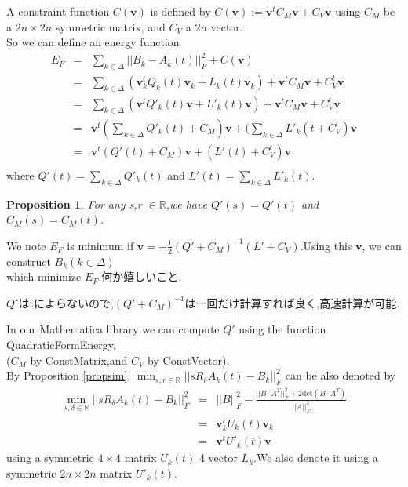 \documentclass[8pt]{article}
\newtheorem{prop}{\bf Proposition}
\begin{document}
A constraint function $C(\mathbf{v})$ is defined by 
$
C(\mathbf{v}) := \mathbf{v}^t C_M \mathbf{v} + C_V \mathbf{v}
$
using $C_M$ be a $2n \times 2n$ symmetric matrix, and $C_V$ a $2n$ vector.\\
So we can define an energy function 
\begin{eqnarray*}
E_F &=& \sum_{k \in \Delta} ||B_k - A_k(t)||^2_F + C(\mathbf{v})\\
	&=& \sum_{k \in \Delta} (\mathbf{v}^t_k Q_k(t) \mathbf{v}_k + L_k(t) \mathbf{v}_k )+ \mathbf{v}^t C_M \mathbf{v} + C_V^t \mathbf{v} \\
	&=& \sum_{k \in \Delta} (\mathbf{\mathbf{v}}^t Q'_k(t) \mathbf{v} + L'_k(t) \mathbf{v}) +  \mathbf{v}^t C_M \mathbf{v} + C_V^t \mathbf{v} \\
	&=& \mathbf{v}^t (\sum_{k \in \Delta} Q'_k(t) + C_M)\mathbf{v} + (\sum_{k \in \Delta}L'_k(t + C_V^t) \mathbf{v}\\
	&=& \mathbf{v}^t (Q'(t) + C_M)\mathbf{v} + (L' (t)+ C_V^t) \mathbf{v}\\
\end{eqnarray*}
where $\displaystyle Q' (t)= \sum_{k \in \Delta}Q'_k(t)$ and $ \displaystyle L'(t) = \sum_{k \in \Delta}L'_k(t)$.\\

\begin{prop}
For any s,r $\in \mathbb{R}$,we have $Q'(s) = Q'(t) $ and $C_M(s) = C_M(t)$.
\end{prop}

We note $E_F$ is minimum if $\mathbf{v} = - \frac{1}{2}(Q' + C_M)^{-1}(L' + C_V)$.Using this $\mathbf{v}$, we can construct $B_k(k \in \Delta)$ \\
which minimize $E_F$.何か嬉しいこと.\\

\begin{screen}
$Q'$はtによらないので,$(Q' + C_M)^{-1}$は一回だけ計算すれば良く,高速計算が可能.
\end{screen}
In our Mathematica library we can compute $Q' $ using the function QuadraticFormEnergy,\\
($C_M$ by ConstMatrix,and $C_V$ by ConstVector).\\


By Proposition \ref{propsim}, $ \displaystyle \min_{s,r \in \mathbb{R}} ||sR_\delta A_k(t) - B_k||_F^2$ can be also denoted by
\begin{eqnarray*}
\min_{s,\delta \in \mathbb{R}}||sR_\delta A_k(t) - B_k||_F^2 &=& ||B||^2_F - \frac{||B \cdot A^T||_F^2 + 2 \mathrm {det}(B \cdot A^T)}{||A||^2_F} \\
&=& \mathbf{v}_k^t U_k(t) \mathbf{v}_k\\
&=& \mathbf{v}^t U'_k(t) \mathbf{v}
\end{eqnarray*}
using  a symmetric $4 \times 4$ matrix $U_k(t)$ 4 vector $L_k$.We also denote it using a symmetric $2n \times 2n$ matrix $U'_k(t)$.\\
\end{document}
